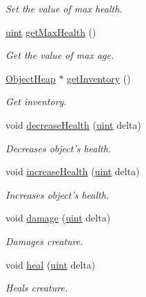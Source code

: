 \begin{DoxyCompactItemize}
\begin{DoxyCompactList}\small\item\em Set the value of max health. \end{DoxyCompactList}\item 
\hyperlink{BasicTypes_8h_a91ad9478d81a7aaf2593e8d9c3d06a14}{uint} \hyperlink{classCreature_a769dea424947603c2fc0fc70513da83e}{get\-Max\-Health} ()
\begin{DoxyCompactList}\small\item\em Get the value of max age. \end{DoxyCompactList}\item 
\hyperlink{classObjectHeap}{Object\-Heap} $\ast$ \hyperlink{classCreature_abe4efe29a57906cd5e23c9dbf4b0bbd2}{get\-Inventory} ()
\begin{DoxyCompactList}\small\item\em Get inventory. \end{DoxyCompactList}\item 
void \hyperlink{classCreature_a5f8683a92ec95eda9abde80480e6f4a4}{decrease\-Health} (\hyperlink{BasicTypes_8h_a91ad9478d81a7aaf2593e8d9c3d06a14}{uint} delta)
\begin{DoxyCompactList}\small\item\em Decreases object's health. \end{DoxyCompactList}\item 
void \hyperlink{classCreature_a078b8ae32873d220e5701a6ee0d76d3b}{increase\-Health} (\hyperlink{BasicTypes_8h_a91ad9478d81a7aaf2593e8d9c3d06a14}{uint} delta)
\begin{DoxyCompactList}\small\item\em Increases object's health. \end{DoxyCompactList}\item 
void \hyperlink{classCreature_a6d216fa9fc5e1a70743ebc9a62dbcc01}{damage} (\hyperlink{BasicTypes_8h_a91ad9478d81a7aaf2593e8d9c3d06a14}{uint} delta)
\begin{DoxyCompactList}\small\item\em Damages creature. \end{DoxyCompactList}\item 
void \hyperlink{classCreature_ab168ec8b1230205eb0dda7edbef60469}{heal} (\hyperlink{BasicTypes_8h_a91ad9478d81a7aaf2593e8d9c3d06a14}{uint} delta)
\begin{DoxyCompactList}\small\item\em Heals creature. \end{DoxyCompactList}\end{DoxyCompactItemize}
